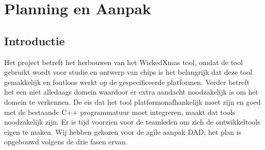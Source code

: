 
\section{Planning en Aanpak}
\subsection{Introductie}
Het project betreft het herbouwen van het WickedXmas tool, omdat de tool gebruikt wordt voor studie
en ontwerp van chips is het belangrijk dat deze tool gemakkelijk en foutloos werkt op de gespecificeerde platformen.
Verder betreft het een niet alledaags domein waardoor er extra aandacht noodzakelijk is om het domein
te verkennen. De eis dat het tool platformonafhankelijk moet zijn en goed met de bestaande C++ programmatuur
moet integreren, maakt dat tools noodzakelijk zijn. Er is tijd voorzien voor de teamleden om zich de ontwikkeltools eigen te maken.
Wij hebben gekozen voor de agile aanpak DAD, het plan is opgebouwd volgens de drie fasen ervan.

